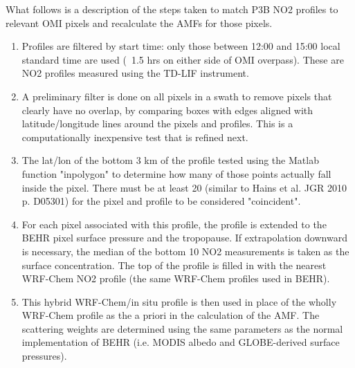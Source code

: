 \documentclass[12pt]{article}
\begin{document}
 What follows is a description of the steps taken to match P3B NO2 profiles
to relevant OMI pixels and recalculate the AMFs for those pixels.

\begin{enumerate}

	\item Profiles are filtered by start time: only those between 12:00 and 15:00
local standard time are used (~1.5 hrs on either side of OMI overpass). These
are NO2 profiles measured using the TD-LIF instrument.

	\item A preliminary filter is done on all pixels in a swath to remove pixels
that clearly have no overlap, by comparing boxes with edges aligned with
latitude/longitude lines around the pixels and profiles.  This is a
computationally inexpensive test that is refined next.

	\item The lat/lon of the bottom 3 km of the profile tested using the Matlab
function "inpolygon" to determine how many of those points actually fall inside
the pixel. There must be at least 20 (similar to Hains et al. JGR 2010 p.
D05301) for the pixel and profile to be considered "coincident".

	\item For each pixel associated with this profile, the profile is extended to
the BEHR pixel surface pressure and the tropopause.  If extrapolation downward
is necessary, the median of the bottom 10 NO2 measurements is taken as the
surface concentration.  The top of the profile is filled in with the nearest
WRF-Chem NO2 profile (the same WRF-Chem profiles used in BEHR).

	\item This hybrid WRF-Chem/in situ profile is then used in place of the wholly
WRF-Chem profile as the a priori in the calculation of the AMF. The scattering
weights are determined using the same parameters as the normal implementation of
BEHR (i.e. MODIS albedo and GLOBE-derived surface pressures).

\end{enumerate}
\end{document}
